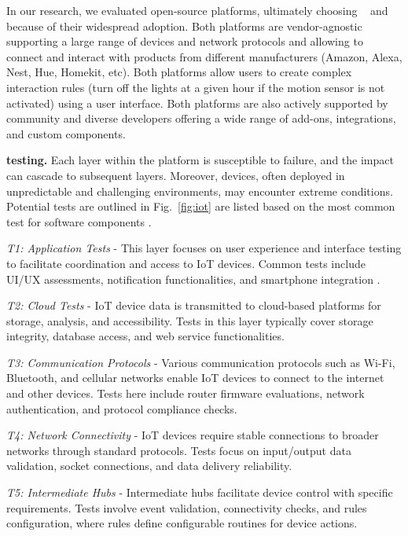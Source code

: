 In our research, we evaluated open-source \iot platforms, ultimately choosing  \openhab~\cite{openhab} and \homeassistant because of their widespread adoption. %
Both platforms are vendor-agnostic supporting a large range of devices and network protocols and allowing to connect and interact with products from different manufacturers (\ie Amazon, Alexa, Nest, Hue, Homekit, etc). Both platforms allow users to create complex interaction rules (\ie turn off the lights at a given hour if the motion sensor is not activated) using a user interface. Both platforms are also actively supported by community and diverse developers offering a wide range of add-ons, integrations, and custom components.

\textbf{\iot testing.} Each layer within the \iot platform is susceptible to failure, and the impact can cascade to subsequent layers. Moreover, \iot devices, often deployed in unpredictable and challenging environments, may encounter extreme conditions. Potential tests are outlined in Fig.~\ref{fig:iot} are listed based on the most common test for software components \cite{linares-vasquez_enabling_2017}.

\textit{T1: Application Tests} - This layer focuses on user experience and interface testing to facilitate coordination and access to IoT devices. Common tests include UI/UX assessments, notification functionalities, and smartphone integration \cite{linares-vasquez_enabling_2017}.

\textit{T2: Cloud Tests} - IoT device data is transmitted to cloud-based platforms for storage, analysis, and accessibility. Tests in this layer typically cover storage integrity, database access, and web service functionalities.

\textit{T3: Communication Protocols} - Various communication protocols such as Wi-Fi, Bluetooth, and cellular networks enable IoT devices to connect to the internet and other devices. Tests here include router firmware evaluations, network authentication, and protocol compliance checks.

\textit{T4: Network Connectivity} - IoT devices require stable connections to broader networks through standard protocols. Tests focus on input/output data validation, socket connections, and data delivery reliability.

\textit{T5: Intermediate Hubs} - Intermediate hubs facilitate device control with specific requirements. Tests involve event validation, connectivity checks, and rules configuration, where rules define configurable routines for device actions.

